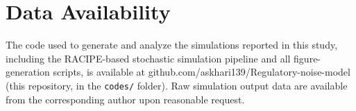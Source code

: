 \documentclass[11pt]{article}
\newcommand{\beginsupplement}{%
        \setcounter{table}{0}
        \renewcommand{\thetable}{S\arabic{table}}%
        \setcounter{figure}{0}
        \renewcommand{\thefigure}{S\arabic{figure}}%
        \setcounter{section}{0}
        \renewcommand{\thesection}{S\arabic{section}}%
     }
\begin{document}
\section{Data Availability}

The code used to generate and analyze the simulations reported in this study, including the RACIPE-based stochastic simulation pipeline and all figure-generation scripts, is available at github.com/askhari139/Regulatory-noise-model (this repository, in the \texttt{codes/} folder). Raw simulation output data are available from the corresponding author upon reasonable request.

\printbibliography

\beginsupplement



% 
% 
\clearpage

\newpage
\clearpage

        

\end{document}
